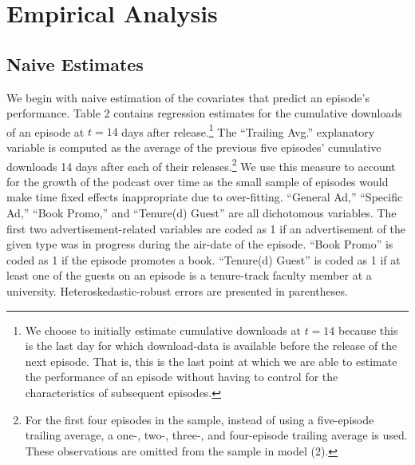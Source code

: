 \documentclass[11pt, letterpaper, twoside]{article}
\begin{document}
\section{Empirical Analysis}
\subsection{Naive Estimates}
We begin with naive estimation of the covariates that predict an episode's performance. Table 2 contains regression estimates for the cumulative downloads of an episode at $t=14$ days after release.\footnote{We choose to initially estimate cumulative downloads at $t=14$ because this is the last day for which download-data is available before the release of the next episode. That is, this is the last point at which we are able to estimate the performance of an episode without having to control for the characteristics of subsequent episodes.} The ``Trailing Avg.'' explanatory variable is computed as the average of the previous five episodes' cumulative downloads 14 days after each of their releases.\footnote{For the first four episodes in the sample, instead of using a five-episode trailing average, a one-, two-, three-, and four-episode trailing average is used. These observations are omitted from the sample in model (2).} We use this measure to account for the growth of the podcast over time as the small sample of episodes would make time fixed effects inappropriate due to over-fitting. ``General Ad,'' ``Specific Ad,'' ``Book Promo,'' and ``Tenure(d) Guest'' are all dichotomous variables. The first two advertisement-related variables are coded as 1 if an advertisement of the given type was in progress during the air-date of the episode. ``Book Promo'' is coded as 1 if the episode promotes a book. ``Tenure(d) Guest'' is coded as 1 if at least one of the guests on an episode is a tenure-track faculty member at a university. Heteroskedastic-robust errors are presented in parentheses.\\


\end{document}
